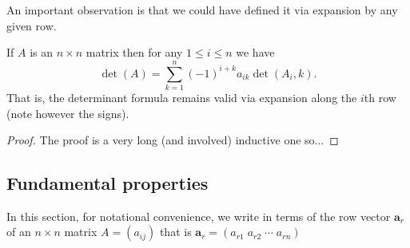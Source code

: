 \documentclass[10pt, a4paper]{article}
\newcommand{\mbf}[1]{\mathbf{#1}}
\begin{document}
An important observation is that we could have defined it via expansion by any given row.
\begin{lemma}\label{pre_linalg_lem_detanyrow}
    If $A$ is an $n \times n$ matrix then for any $1 \leq i \leq n$ we have
    \[
    \det(A) = \sum_{k = 1}^{n}(-1) ^ {i + k}a_{ik}\det(A_i, k).
    \]
    That is,
    the determinant formula remains valid via expansion along the $i$th row
    (note however the signs).
    \begin{proof}
        The proof is a very long (and involved) inductive one so$\dotsc$
    \end{proof}
\end{lemma}

\subsection{Fundamental properties}
In this section,
for notational convenience,
we write in terms of the row vector $\mbf{a}_r$ of an $n \times n$ matrix $A = (a_{ij})$ that is $\mbf{a}_r = (a_{r1}\; a_{r2}\; \dotsi \; a_{rn})$
\end{document}
